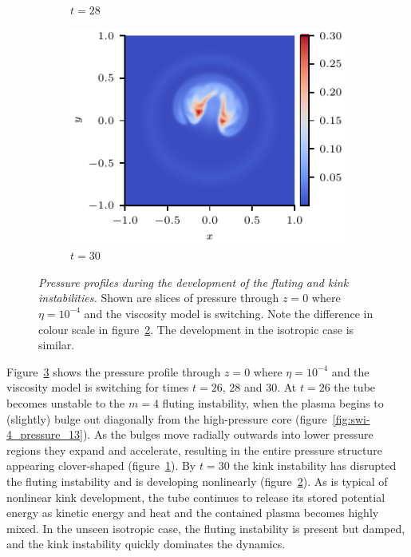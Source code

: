 \documentclass[12pt]{article}
\newcommand{\mycaption}[2]{\caption[#1]{\emph{#1} #2}}
\begin{document}
\begin{figure}[t]
\begin{subfigure}{0.32\textwidth}
      \caption{$t=28$}
      \label{fig:swi-4_pressure_14}
    \end{subfigure}
    \hfill
    \begin{subfigure}{0.32\textwidth}
      \includegraphics[width=\linewidth]{swi-4_pressure_15.pdf}
      \caption{$t=30$}
      \label{fig:swi-4_pressure_15}
    \end{subfigure}
\mycaption{Pressure profiles during the development of the fluting and kink instabilities.}{Shown are slices of pressure through $z=0$ where $\eta = 10^{-4}$ and the viscosity model is switching. Note the difference in colour scale in figure~\ref{fig:swi-4_pressure_15}. The development in the isotropic case is similar.}
\label{fig:kink_pressure_slices-4}%
\end{figure}

Figure~\ref{fig:kink_pressure_slices-4} shows the pressure profile through $z=0$ where $\eta=10^{-4}$ and the viscosity model is switching for times $t=26$, $28$ and $30$. At $t=26$ the tube becomes unstable to the $m=4$ fluting instability, when the plasma begins to (slightly) bulge out diagonally from the high-pressure core (figure~\ref{fig:swi-4_pressure_13}). As the bulges move radially outwards into lower pressure regions they expand and accelerate, resulting in the entire pressure structure appearing clover-shaped (figure~\ref{fig:swi-4_pressure_14}). By $t=30$ the kink instability has disrupted the fluting instability and is developing nonlinearly (figure~\ref{fig:swi-4_pressure_15}). As is typical of nonlinear kink development, the tube continues to release its stored potential energy as kinetic energy and heat and the contained plasma becomes highly mixed. In the unseen isotropic case, the fluting instability is present but damped, and the kink instability quickly dominates the dynamics.
\end{document}
